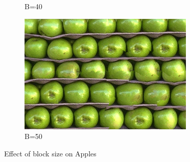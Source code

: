 \documentclass[10pt,twocolumn,letterpaper]{article}
\begin{document}
\begin{figure}[h]
\begin{subfigure}[h]{0.2\textwidth}
       \caption{B=40}
   \end{subfigure}
   \begin{subfigure}[h]{0.2\textwidth}
       \centering
       \includegraphics[scale=0.25]{../results/syn/out_apples_B_50.png}
       \caption{B=50}
   \end{subfigure}
   \caption{Effect of block size on Apples}
   \label{fig:ap_bs}
\end{figure}
\end{document}
